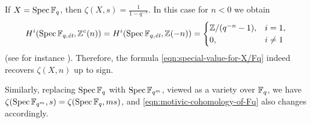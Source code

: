 \documentclass{article}
\numberwithin{equation}{section}
\begin{document}
\begin{example}
  \label{example:C(X,n)-for-Spec-Fq}
  If $X = \operatorname{Spec} \mathbb{F}_q$, then $\zeta (X,s) = \frac{1}{1 - q^{-s}}$. In this case
  for $n < 0$ we obtain
  \begin{equation}
    \label{eqn:motivic-cohomology-of-Fq}
    H^i (\Spec \FF_{q,\et}, \ZZ^c (n)) = H^i (\Spec \FF_{q,\et}, \ZZ (-n)) =
    \begin{cases}
      \ZZ/(q^{-n} - 1), & i = 1, \\
      0, & i \ne 1
    \end{cases}
  \end{equation}
  (see for instance \cite[Example~4.2]{Geisser-2017}).
  Therefore, the formula \eqref{eqn:special-value-for-X/Fq} indeed recovers
  $\zeta (X,n)$ up to sign.

  Similarly, replacing $\operatorname{Spec} \mathbb{F}_q$ with $\operatorname{Spec} \mathbb{F}_{q^m}$, viewed as a variety
  over $\mathbb{F}_q$, we have $\zeta (\operatorname{Spec} \mathbb{F}_{q^m},s) = \zeta (\operatorname{Spec} \mathbb{F}_q, ms)$,
  and \eqref{eqn:motivic-cohomology-of-Fq} also changes accordingly.
\end{example}
\end{document}
